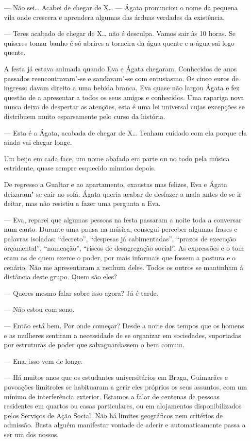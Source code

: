 --- Não sei\ldots{} Acabei de chegar de X\ldots{} --- Ágata pronunciou o nome da
  pequena vila onde crescera e aprendera algumas das árduas verdades
  da existência.

--- Teres acabado de chegar de X\ldots{} não é desculpa. Vamos sair às 10
  horas. Se quiseres tomar banho é só abrires a torneira da água quente
  e a água sai logo quente.

A festa já estava animada quando Eva e Ágata chegaram. Conhecidos de
anos passados reencontravam"-se e saudavam"-se com entusiasmo. Os cinco
euros de ingresso davam direito a uma bebida branca. Eva quase não
largou Ágata e fez questão de a apresentar a todos os seus amigos e
conhecidos. Uma rapariga nova nunca deixa de despertar as atenções,
esta é uma lei universal cujas excepções se distribuem muito esparsamente pelo
curso da história.

--- Esta é a Ágata, acabada de chegar de X\ldots{} Tenham cuidado com ela
  porque ela ainda vai chegar longe.

Um beijo em cada face, um nome abafado em parte ou no todo pela música
estridente, quase sempre esquecido minutos depois.

De regresso a Gualtar e ao apartamento, exaustas mas felizes, Eva e
Ágata deixaram"-se cair no sofá. Ágata queria acabar de desfazer a mala
antes de se ir deitar, mas não resistiu a fazer uma pergunta a Eva.

--- Eva, reparei que algumas pessoas na festa passaram a noite toda a
  conversar num canto. Durante uma pausa na música, consegui perceber
  algumas frases e palavras isoladas: ``decreto'', ``despesas já
  cabimentadas'', ``prazos de execução orçamental'', ``nomeação'',
  ``riscos de desagregação social''. As expressões e o tom eram as de
  quem exerce o poder, por mais informais que fossem a postura e o
  cenário. Não me apresentaram a nenhum deles. Todos os outros se
  mantinham à distância deste grupo. Quem são eles?

--- Queres mesmo falar sobre isso agora? Já é tarde.

--- Não estou com sono.

--- Então está bem. Por onde começar? Desde a noite dos tempos que os
  homens e as mulheres sentiram a necessidade de se organizar em
  sociedades, suportadas por estruturas de poder que salvaguardassem o
  bem comum.

--- Ena, isso vem de longe.

--- Há muitos anos que os estudantes universitários em Braga, Guimarães e
  povoações limítrofes se habituaram a gerir eles próprios os seus
  assuntos, com um mínimo de interferência exterior. Estamos a falar
  de centenas de pessoas residentes em quartos ou casas
  particulares, ou em alojamentos disponibilizados
pelos Serviços de Ação Social. Não há limites geográficos nem
critérios de admissão. Basta alguém manifestar vontade de aderir e
automaticamente passa a ser um dos nossos.


